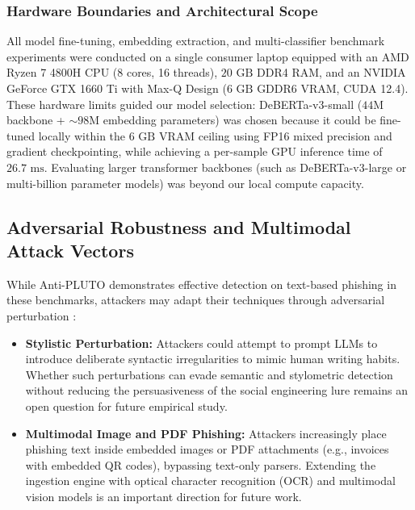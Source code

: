 \documentclass[journal]{IEEEtran}
\begin{document}
\subsubsection{Hardware Boundaries and Architectural Scope}
All model fine-tuning, embedding extraction, and multi-classifier benchmark experiments were conducted on a single consumer laptop equipped with an AMD Ryzen 7 4800H CPU (8 cores, 16 threads), $20\text{ GB}$ DDR4 RAM, and an NVIDIA GeForce GTX 1660 Ti with Max-Q Design ($6\text{ GB}$ GDDR6 VRAM, CUDA 12.4). These hardware limits guided our model selection: DeBERTa-v3-small ($44\text{M}$ backbone + $\sim$$98\text{M}$ embedding parameters) was chosen because it could be fine-tuned locally within the $6\text{ GB}$ VRAM ceiling using FP16 mixed precision and gradient checkpointing, while achieving a per-sample GPU inference time of $26.7\text{ ms}$. Evaluating larger transformer backbones (such as DeBERTa-v3-large or multi-billion parameter models) was beyond our local compute capacity.

\subsection{Adversarial Robustness and Multimodal Attack Vectors}
While Anti-PLUTO demonstrates effective detection on text-based phishing in these benchmarks, attackers may adapt their techniques through adversarial perturbation \cite{morris2020textattack}:
\begin{itemize}
    \item \textbf{Stylistic Perturbation:} Attackers could attempt to prompt LLMs to introduce deliberate syntactic irregularities to mimic human writing habits. Whether such perturbations can evade semantic and stylometric detection without reducing the persuasiveness of the social engineering lure remains an open question for future empirical study.
    \item \textbf{Multimodal Image and PDF Phishing:} Attackers increasingly place phishing text inside embedded images or PDF attachments (e.g., invoices with embedded QR codes), bypassing text-only parsers. Extending the ingestion engine with optical character recognition (OCR) and multimodal vision models is an important direction for future work.
\end{itemize}
\end{document}
